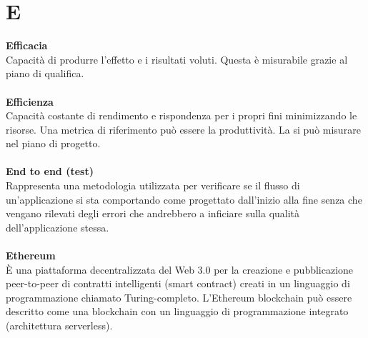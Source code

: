 \section{E}
\textbf{Efficacia}\\
Capacità di produrre l'effetto e i risultati voluti. Questa è misurabile grazie al piano di qualifica. \\ \\
\textbf{Efficienza}\\
Capacità costante di rendimento e rispondenza per i propri fini minimizzando le risorse. Una metrica di riferimento può essere la  produttività. La si può misurare nel piano di progetto. \\ \\
\textbf{End to end (test)}\\
Rappresenta una metodologia utilizzata per verificare se il flusso di un'applicazione si sta comportando come progettato dall'inizio alla fine senza che vengano rilevati degli errori che andrebbero a inficiare sulla qualità dell’applicazione stessa. \\ \\
\textbf{Ethereum}\\
È una piattaforma decentralizzata del Web 3.0 per la creazione e pubblicazione peer-to-peer di contratti intelligenti (smart contract) creati in un linguaggio di programmazione chiamato Turing-completo. L'Ethereum blockchain può essere descritto come una blockchain con un linguaggio di programmazione integrato (architettura serverless). \\ \\
\clearpage